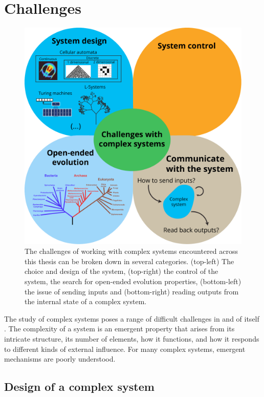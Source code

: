 \section{Challenges}

\begin{figure}[htbp]
  \centering
  \includegraphics[width=.9\linewidth]{figures/challenges}
  \caption{The challenges of working with complex systems encountered across
    this thesis can be broken down in several categories. (top-left) The choice
    and design of the system, (top-right) the control of the system, the search
    for open-ended evolution properties, (bottom-left) the issue of sending
    inputs and (bottom-right) reading outputs from the internal state of a
    complex system.}
  \label{fig:challenges}
\end{figure}

The study of complex systems poses a range of difficult challenges in and of
itself \parencite{sanmiguelChallengesComplexSystems2012}. The complexity of a system
is an emergent property that arises from its intricate structure, its number of
elements, how it functions, and how it responds to different kinds of external
influence. For many complex systems, emergent mechanisms are poorly
understood.


\subsection{Design of a complex system}

